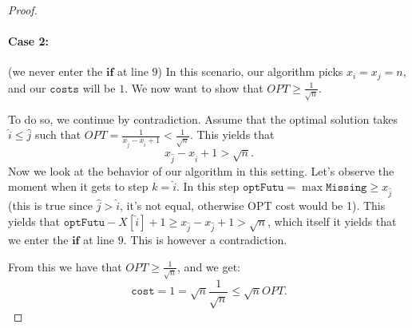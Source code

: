 \documentclass[11pt]{article}
\begin{document}
\begin{enumerate}
\begin{proof}
            \paragraph*{Case 2:}(we never enter the $\mathbf{if}$ at line $9$) In this scenario, our algorithm picks $x_i = x_j = n$, and our $\mathtt{costs}$ will be $1$. We now want to show that $OPT \geq \frac{1}{\sqrt{n}}$. 
            
            To do so, we continue by contradiction. Assume that the optimal solution takes $\hat i \leq \hat j$ such that $OPT = \frac{1}{x_{\hat j}-x_{\hat i}+1} < \frac{1}{\sqrt{n}}$. This yields that 
            \begin{equation*}
                x_{\hat j}-x_{\hat i}+1 > \sqrt{n}.
            \end{equation*}
            Now we look at the behavior of our algorithm in this setting. Let's observe the moment when it gets to step $k = \hat i$. In this step $\mathtt{optFutu} = \max \mathtt{Missing} \geq x_{\hat j}$ (this is true since $\hat j > \hat i$, it's not equal, otherwise OPT cost would be 1). This yields that $\mathtt{optFutu} - X[\hat i] + 1 \geq x_{\hat j} -x_{\hat j} + 1 > \sqrt{n}$, which itself it yields that we enter the $\mathbf{if}$ at line $9$. This is however a contradiction. 

            From this we have that $OPT \geq \frac{1}{\sqrt{n}}$, and we get:
            \begin{equation*}
                \mathtt{cost} = 1 = \sqrt{n}\frac{1}{\sqrt{n}} \leq \sqrt{n}OPT.
            \end{equation*}

\end{proof}
\end{enumerate}
\end{document}
